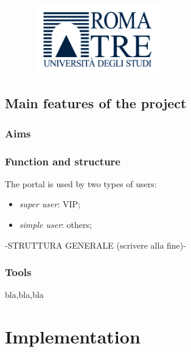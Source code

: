 \documentclass[a4paper]{report}
\begin{document}
\begin{figure}[hb]
\centering
\includegraphics[height=3cm, width=6cm]{logoRomaTre.jpg}
\end{figure}

\chapter{Main features of the project}
\section{Aims}


\section{Function and structure}
The portal is used by two types of users:
\begin{itemize}
   \item \textit{super user}: VIP;
   \item \textit{simple user}: others;
\end{itemize}

-STRUTTURA GENERALE (scrivere alla fine)-


\section{Tools}
bla,bla,bla


\part{Implementation}
\end{document}
